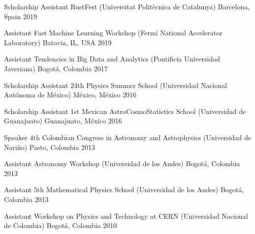 


\begin{cvhonors}

    \cvhonor
    {Scholarship Assistant}
    {RustFest (Universitat Politècnica de Catalunya)}
    {Barcelona, Spain}
    {2019}

    \cvhonor
    {Assistant}
    {Fast Machine Learning Workshop (Fermi National Accelerator Laboratory)}
    {Batavia, IL, USA}
    {2019}

    \cvhonor
    {Assistant}
    {Tendencies in Big Data and Analytics (Pontificia Universidad Javeriana)}
    {Bogotá, Colombia}
    {2017}

    \cvhonor
    {Scholarship Assistant} %
    {24th Physics Summer School (Universidad Nacional Autónoma de México)} %
    {México, México} %
    {2016} %

    \cvhonor
    {Scholarship Assistant} %
    {1st Mexican AstroCosmoStatistics School (Universidad de Guanajuato)} %
    {Guanajuato, México} %
    {2016} %

    \cvhonor
    {Speaker} %
    {4th Colombian Congress in Astronomy and Astrophysics (Universidad de Nariño)} %
    {Pasto, Colombia} %
    {2013} %

    \cvhonor
    {Assistant} %
    {Astronomy Workshop (Universidad de los Andes)} %
    {Bogotá, Colombia} %
    {2013} %

    \cvhonor
    {Assistant} %
    {5th Mathematical Physics School (Universidad de los Andes)} %
    {Bogotá, Colombia} %
    {2013} %

    \cvhonor
    {Assistant} %
    {Workshop on Physics and Technology at CERN (Universidad Nacional de Colombia)} %
    {Bogotá, Colombia} %
    {2010} %

\end{cvhonors}
